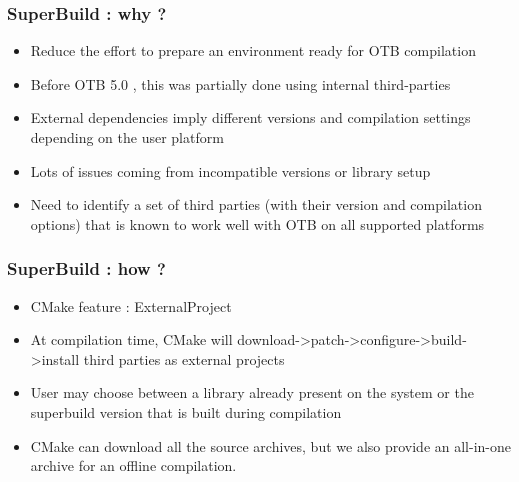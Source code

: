 \documentclass[8pt]{beamer}
\begin{document}
\begin{frame}
\frametitle{SuperBuild : why ?}

\begin{itemize}
\item Reduce the effort to prepare an environment ready for OTB compilation
\item Before OTB 5.0 , this was partially done using internal third-parties
\item External dependencies imply different versions and compilation settings depending on the user platform
\item Lots of issues coming from incompatible versions or library setup
\item Need to identify a set of third parties (with their version and compilation options) 
that is known to work well with OTB on all supported platforms
\end{itemize}

\end{frame}

\begin{frame}
\frametitle{SuperBuild : how ?}

\begin{itemize}
\item CMake feature : ExternalProject
\item At compilation time, CMake will download->patch->configure->build->install third parties as external projects
\item User may choose between a library already present on the system or the superbuild version that is built during compilation
\item CMake can download all the source archives, but we also provide an all-in-one archive for an offline compilation.
\end{itemize}

\end{frame}
\end{document}
